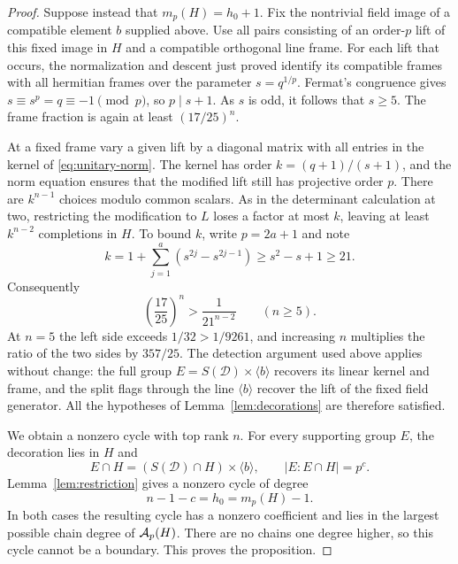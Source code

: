 \begin{proof}
Suppose instead that $m_p(H)=h_0+1$.  Fix the nontrivial field image
of a compatible element $b$ supplied above.  Use all pairs consisting
of an order-$p$ lift of this fixed image in $H$ and a compatible
orthogonal line frame.  For each lift that occurs, the normalization and
descent just proved identify its compatible frames with all hermitian
frames over the parameter $s=q^{1/p}$.  Fermat's congruence gives
$s\equiv s^p=q\equiv-1\pmod p$, so $p\mid s+1$.
As $s$ is odd, it follows that $s\ge5$.  The frame fraction is again
at least $(17/25)^n$.

At a fixed frame vary a given lift by a diagonal matrix with all entries
in the kernel of \eqref{eq:unitary-norm}.  The kernel has order
$k=(q+1)/(s+1)$, and the norm equation ensures that the modified lift
still has projective order $p$.  There are $k^{n-1}$ choices modulo
common scalars.  As in the determinant calculation at two, restricting
the modification to $L$ loses a factor at most $k$, leaving at least
$k^{n-2}$ completions in $H$.  To bound $k$, write $p=2a+1$ and note
\[
 k=1+\sum_{j=1}^{a}(s^{2j}-s^{2j-1})
 \ge s^2-s+1\ge21.
\]
Consequently
\[
 \left(\frac{17}{25}\right)^n>\frac1{21^{n-2}}
 \qquad(n\ge5).
\]
At $n=5$ the left side exceeds $1/32>1/9261$, and increasing $n$
multiplies the ratio of the two sides by $357/25$.
The detection argument used above applies without change: the full
group $E=S(\mathcal D)\times\langle b\rangle$ recovers its linear
kernel and frame, and the split flags through the line $\langle b\rangle$
recover the lift of the fixed field generator.  All the hypotheses of
Lemma~\ref{lem:decorations} are therefore satisfied.

We obtain a nonzero cycle with top rank $n$.  For every supporting group
$E$, the decoration lies in $H$ and
\[
 E\cap H=(S(\mathcal D)\cap H)\times\langle b\rangle,
 \qquad |E:E\cap H|=p^c.
\]
Lemma~\ref{lem:restriction} gives a nonzero cycle of degree
\begin{equation}\label{eq:unitary-decorated-degree}
 n-1-c=h_0=m_p(H)-1.
\end{equation}
In both cases the resulting cycle has a nonzero coefficient and lies
in the largest possible chain degree of $\mathcal A_p(H)$.  There are no chains
one degree higher, so this cycle cannot be a boundary.  This proves the
proposition.
\end{proof}
